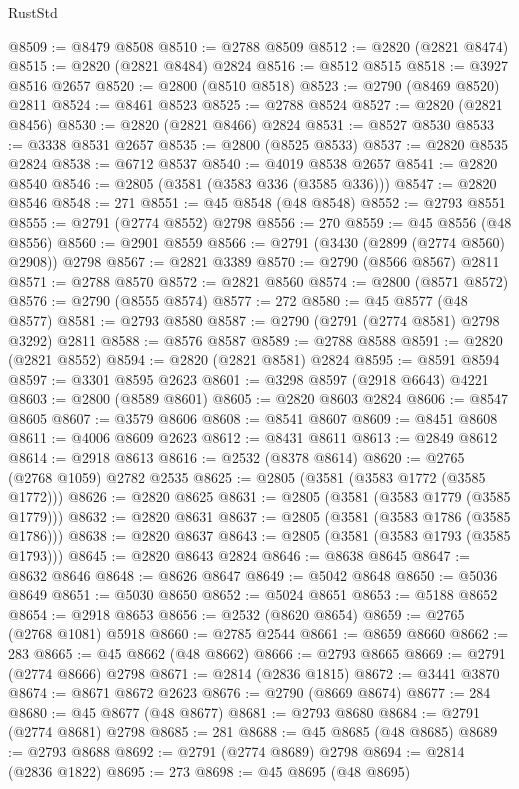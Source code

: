\begin{lexlean}{RustStd}
\begin{coremodule}
@8509 := @8479 @8508
@8510 := @2788 @8509
@8512 := @2820 (@2821 @8474)
@8515 := @2820 (@2821 @8484) @2824
@8516 := @8512 @8515
@8518 := @3927 @8516 @2657
@8520 := @2800 (@8510 @8518)
@8523 := @2790 (@8469 @8520) @2811
@8524 := @8461 @8523
@8525 := @2788 @8524
@8527 := @2820 (@2821 @8456)
@8530 := @2820 (@2821 @8466) @2824
@8531 := @8527 @8530
@8533 := @3338 @8531 @2657
@8535 := @2800 (@8525 @8533)
@8537 := @2820 @8535 @2824
@8538 := @6712 @8537
@8540 := @4019 @8538 @2657
@8541 := @2820 @8540
@8546 := @2805 (@3581 (@3583 @336 (@3585 @336)))
@8547 := @2820 @8546
@8548 := 271
@8551 := @45 @8548 (@48 @8548)
@8552 := @2793 @8551
@8555 := @2791 (@2774 @8552) @2798
@8556 := 270
@8559 := @45 @8556 (@48 @8556)
@8560 := @2901 @8559
@8566 := @2791 (@3430 (@2899 (@2774 @8560) @2908)) @2798
@8567 := @2821 @3389
@8570 := @2790 (@8566 @8567) @2811
@8571 := @2788 @8570
@8572 := @2821 @8560
@8574 := @2800 (@8571 @8572)
@8576 := @2790 (@8555 @8574)
@8577 := 272
@8580 := @45 @8577 (@48 @8577)
@8581 := @2793 @8580
@8587 := @2790 (@2791 (@2774 @8581) @2798 @3292) @2811
@8588 := @8576 @8587
@8589 := @2788 @8588
@8591 := @2820 (@2821 @8552)
@8594 := @2820 (@2821 @8581) @2824
@8595 := @8591 @8594
@8597 := @3301 @8595 @2623
@8601 := @3298 @8597 (@2918 @6643) @4221
@8603 := @2800 (@8589 @8601)
@8605 := @2820 @8603 @2824
@8606 := @8547 @8605
@8607 := @3579 @8606
@8608 := @8541 @8607
@8609 := @8451 @8608
@8611 := @4006 @8609 @2623
@8612 := @8431 @8611
@8613 := @2849 @8612
@8614 := @2918 @8613
@8616 := @2532 (@8378 @8614)
@8620 := @2765 (@2768 @1059) @2782 @2535
@8625 := @2805 (@3581 (@3583 @1772 (@3585 @1772)))
@8626 := @2820 @8625
@8631 := @2805 (@3581 (@3583 @1779 (@3585 @1779)))
@8632 := @2820 @8631
@8637 := @2805 (@3581 (@3583 @1786 (@3585 @1786)))
@8638 := @2820 @8637
@8643 := @2805 (@3581 (@3583 @1793 (@3585 @1793)))
@8645 := @2820 @8643 @2824
@8646 := @8638 @8645
@8647 := @8632 @8646
@8648 := @8626 @8647
@8649 := @5042 @8648
@8650 := @5036 @8649
@8651 := @5030 @8650
@8652 := @5024 @8651
@8653 := @5188 @8652
@8654 := @2918 @8653
@8656 := @2532 (@8620 @8654)
@8659 := @2765 (@2768 @1081) @5918
@8660 := @2785 @2544
@8661 := @8659 @8660
@8662 := 283
@8665 := @45 @8662 (@48 @8662)
@8666 := @2793 @8665
@8669 := @2791 (@2774 @8666) @2798
@8671 := @2814 (@2836 @1815)
@8672 := @3441 @3870
@8674 := @8671 @8672 @2623
@8676 := @2790 (@8669 @8674)
@8677 := 284
@8680 := @45 @8677 (@48 @8677)
@8681 := @2793 @8680
@8684 := @2791 (@2774 @8681) @2798
@8685 := 281
@8688 := @45 @8685 (@48 @8685)
@8689 := @2793 @8688
@8692 := @2791 (@2774 @8689) @2798
@8694 := @2814 (@2836 @1822)
@8695 := 273
@8698 := @45 @8695 (@48 @8695)

\end{coremodule}
\end{lexlean}
